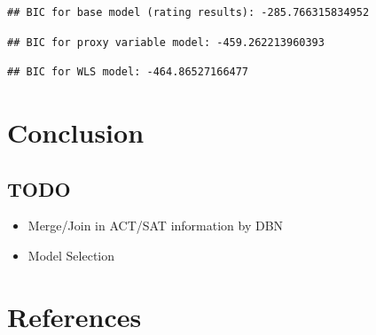 \documentclass[
  man]{apa6}
\providecommand{\tightlist}{%
  \setlength{\itemsep}{0pt}\setlength{\parskip}{0pt}}
\begin{document}
\begin{verbatim}
## BIC for base model (rating results): -285.766315834952
\end{verbatim}

\begin{verbatim}
## BIC for proxy variable model: -459.262213960393
\end{verbatim}

\begin{verbatim}
## BIC for WLS model: -464.86527166477
\end{verbatim}

\hypertarget{conclusion}{%
\section{Conclusion}\label{conclusion}}

\hypertarget{todo}{%
\subsection{TODO}\label{todo}}

\begin{itemize}
\tightlist
\item
  Merge/Join in ACT/SAT information by DBN
\item
  Model Selection
\end{itemize}

\newpage

\hypertarget{references}{%
\section{References}\label{references}}
\end{document}
